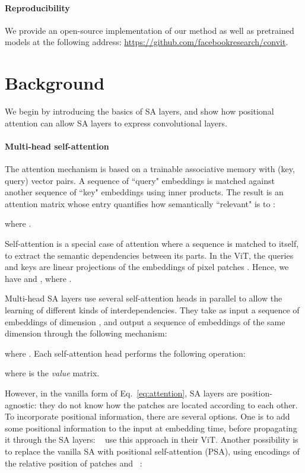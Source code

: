 \paragraph{Reproducibility}
We provide an open-source implementation of our method as well as pretrained models at the following address: \url{https://github.com/facebookresearch/convit}.

\section{Background}

We begin by introducing the basics of SA layers, and show how positional attention can allow SA layers to express convolutional layers.

\paragraph{Multi-head self-attention} \label{sec:mhsa}

The attention mechanism is based on a trainable associative memory with (key, query) vector pairs. A sequence of  ``query" embeddings  is matched against another sequence of  ``key" embeddings  using inner products. The result is an attention matrix whose entry  quantifies how semantically ``relevant"  is to :

where .

Self-attention is a special case of attention where a sequence is matched to itself, to extract the semantic dependencies between its parts. In the ViT, the queries and keys are linear projections of the embeddings of  pixel patches . Hence, we have  and , where . 

Multi-head SA layers use several self-attention heads in parallel to allow the learning of different kinds of interdependencies. They take as input a sequence of  embeddings of dimension , and output a sequence of  embeddings of the same dimension through the following mechanism:

where . Each self-attention head  performs the following operation:  

where  is the \emph{value} matrix.

However, in the vanilla form of Eq.~\ref{eq:attention}, SA layers are position-agnostic: they do not know how the patches are located according to each other. To incorporate positional information, there are several options. One is to add some positional information to the input at embedding time, before propagating it through the SA layers: ~\cite{dosovitskiy2020image} use this approach in their ViT. Another possibility is to replace the vanilla SA with positional self-attention (PSA), using encodings  of the relative position of patches  and ~\cite{ramachandran2019stand}:

